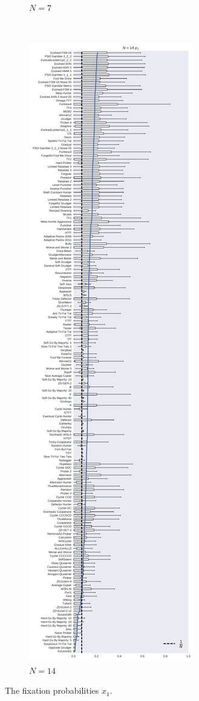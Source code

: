 \documentclass{article}
\begin{document}
\begin{figure}[!hbtp]
\begin{subfigure}{.3\textwidth}
        \caption{\(N=7\)}
        \label{fig:boxplot_7_invade}
    \end{subfigure}%
    ~
    \begin{subfigure}{.3\textwidth}
        \centering
        \includegraphics[height=.9\textheight]{./img/boxplot_14_invade.pdf}
        \caption{\(N=14\)}
        \label{fig:boxplot_14_invade}
    \end{subfigure}
    \caption{The fixation probabilities \(x_1\).}
\end{figure}
\end{document}
